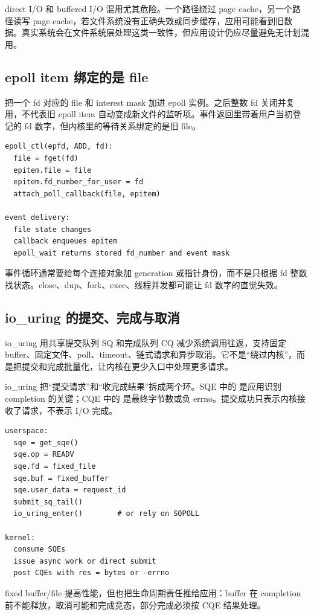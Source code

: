 direct I/O 和 buffered I/O 混用尤其危险。一个路径绕过 page cache，另一个路径读写 page cache，若文件系统没有正确失效或同步缓存，应用可能看到旧数据。真实系统会在文件系统层处理这类一致性，但应用设计仍应尽量避免无计划混用。

\subsection{epoll item 绑定的是 file}

 把一个 fd 对应的 file 和 interest mask 加进 epoll 实例。之后整数 fd 关闭并复用，不代表旧 epoll item 自动变成新文件的监听项。事件返回里带着用户当初登记的 fd 数字，但内核里的等待关系绑定的是旧 file。

\begin{lstlisting}
epoll_ctl(epfd, ADD, fd):
  file = fget(fd)
  epitem.file = file
  epitem.fd_number_for_user = fd
  attach_poll_callback(file, epitem)

event delivery:
  file state changes
  callback enqueues epitem
  epoll_wait returns stored fd_number and event mask
\end{lstlisting}

事件循环通常要给每个连接对象加 generation 或指针身份，而不是只根据 fd 整数找状态。close、dup、fork、exec、线程并发都可能让 fd 数字的直觉失效。

\subsection{io\_uring 的提交、完成与取消}

io\_uring 用共享提交队列 SQ 和完成队列 CQ 减少系统调用往返，支持固定 buffer、固定文件、poll、timeout、链式请求和异步取消。它不是“绕过内核”，而是把提交和完成批量化，让内核在更少入口中处理更多请求。

io\_uring 把“提交请求”和“收完成结果”拆成两个环。SQE 中的  是应用识别 completion 的关键；CQE 中的  是最终字节数或负 errno。提交成功只表示内核接收了请求，不表示 I/O 完成。

\begin{lstlisting}
userspace:
  sqe = get_sqe()
  sqe.op = READV
  sqe.fd = fixed_file
  sqe.buf = fixed_buffer
  sqe.user_data = request_id
  submit_sq_tail()
  io_uring_enter()        # or rely on SQPOLL

kernel:
  consume SQEs
  issue async work or direct submit
  post CQEs with res = bytes or -errno
\end{lstlisting}

fixed buffer/file 提高性能，但也把生命周期责任推给应用：buffer 在 completion 前不能释放，取消可能和完成竞态，部分完成必须按 CQE 结果处理。

